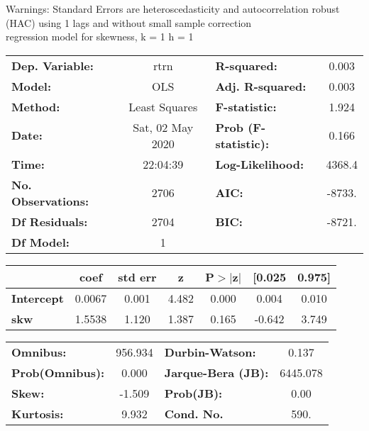 Warnings: \newline
 [1] Standard Errors are heteroscedasticity and autocorrelation robust (HAC) using 1 lags and without small sample correction\\ 

regression model for skewness, k = 1 h = 1\begin{center}
\begin{tabular}{lclc}
\toprule
\textbf{Dep. Variable:}    &       rtrn       & \textbf{  R-squared:         } &     0.003   \\
\textbf{Model:}            &       OLS        & \textbf{  Adj. R-squared:    } &     0.003   \\
\textbf{Method:}           &  Least Squares   & \textbf{  F-statistic:       } &     1.924   \\
\textbf{Date:}             & Sat, 02 May 2020 & \textbf{  Prob (F-statistic):} &    0.166    \\
\textbf{Time:}             &     22:04:39     & \textbf{  Log-Likelihood:    } &    4368.4   \\
\textbf{No. Observations:} &        2706      & \textbf{  AIC:               } &    -8733.   \\
\textbf{Df Residuals:}     &        2704      & \textbf{  BIC:               } &    -8721.   \\
\textbf{Df Model:}         &           1      & \textbf{                     } &             \\
\bottomrule
\end{tabular}
\begin{tabular}{lcccccc}
                   & \textbf{coef} & \textbf{std err} & \textbf{z} & \textbf{P$> |$z$|$} & \textbf{[0.025} & \textbf{0.975]}  \\
\midrule
\textbf{Intercept} &       0.0067  &        0.001     &     4.482  &         0.000        &        0.004    &        0.010     \\
\textbf{skw}       &       1.5538  &        1.120     &     1.387  &         0.165        &       -0.642    &        3.749     \\
\bottomrule
\end{tabular}
\begin{tabular}{lclc}
\textbf{Omnibus:}       & 956.934 & \textbf{  Durbin-Watson:     } &    0.137  \\
\textbf{Prob(Omnibus):} &   0.000 & \textbf{  Jarque-Bera (JB):  } & 6445.078  \\
\textbf{Skew:}          &  -1.509 & \textbf{  Prob(JB):          } &     0.00  \\
\textbf{Kurtosis:}      &   9.932 & \textbf{  Cond. No.          } &     590.  \\
\bottomrule
\end{tabular}
\end{center}

